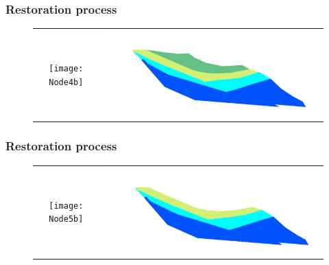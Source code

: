 \documentclass{beamer}
\begin{document}
	\begin{frame}
	\frametitle{Restoration process}
	\begin{figure}[H]
	\centering
	\begin{tabular}{@{}cc@{}}
	\texttt{[image: Node4b]}&
	\includegraphics[width=.65\textwidth]{chartreusedroite27.png}\\
	\end{tabular}
	\end{figure}
	\end{frame}
	
	\begin{frame}
	\frametitle{Restoration process}
	\begin{figure}[H]
	\centering
	\begin{tabular}{@{}cc@{}}
	\texttt{[image: Node5b]}&
	\includegraphics[width=.65\textwidth]{chartreusedroite28.png}\\
	\end{tabular}
	\end{figure}
	\end{frame}
	
\end{document}
